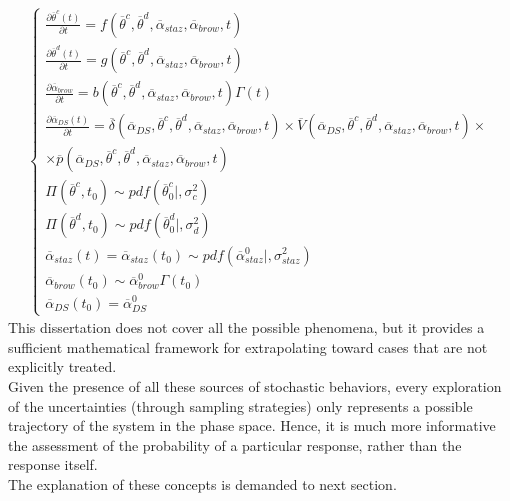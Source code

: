 \begin{equation}
\label{eq:fullSystemApprox1-3}
\begin{split}
\left\{\begin{matrix}
\frac{\partial  \overline{\theta}^{c}\left ( t \right )}{\partial t}=f\left ( \overline{\theta}^{c},\overline{\theta}^{d}, \overline{\alpha}_{staz} ,\overline{\alpha}_{brow},      t \right ) \\
\frac{\partial  \overline{\theta}^{d}\left ( t \right )}{\partial t}=g\left ( \overline{\theta}^{c},\overline{\theta}^{d},\overline{\alpha}_{staz},\overline{\alpha}_{brow},t \right )\\
\frac{\partial \overline{\alpha}_{brow} }{\partial t}=b\left ( \overline{\theta}^{c},\overline{\theta}^{d},\overline{\alpha}_{staz},\overline{\alpha}_{brow},t \right )\Gamma \left ( t \right ) \\
\frac{\partial  \overline{\alpha }_{DS}\left ( t \right )}{\partial t}=  \overline{\delta}\left ( \overline{\alpha }_{DS}, \overline{\theta}^{c},\overline{\theta}^{d},\overline{\alpha}_{staz},\overline{\alpha}_{brow},t \right ) \times \overline{V}\left ( \overline{\alpha }_{DS}, \overline{\theta}^{c},\overline{\theta}^{d},\overline{\alpha}_{staz},\overline{\alpha}_{brow},t \right ) \times
\\ \times  \overline{p}\left ( \overline{\alpha }_{DS}, \overline{\theta}^{c},\overline{\theta}^{d},\overline{\alpha}_{staz},\overline{\alpha}_{brow},t \right )
\\
\Pi \left ( \overline{\theta}^{c},t_{0} \right ) \sim pdf\left ( \overline{\theta}^{c}_{0}|,\sigma_{c}^{2} \right )\\
\Pi \left ( \overline{\theta}^{d},t_{0} \right ) \sim pdf\left ( \overline{\theta}^{d}_{0}|,\sigma_{d}^{2} \right ) \\
\overline{\alpha}_{staz}\left ( t \right )=\overline{\alpha}_{staz}\left ( t_{0} \right ) \sim pdf\left ( \overline{\alpha}_{staz}^{0}|, \sigma_{staz}^{2} \right ) \\
\overline{\alpha}_{brow}\left ( t_{0} \right ) \sim  \overline{\alpha}_{brow}^{0} \Gamma \left ( t_{0} \right ) \\
\overline{\alpha}_{DS} \left ( t_{0} \right ) = \overline{\alpha}_{DS} ^{0}
\end{matrix}\right.
\end{split}
\end{equation}
This dissertation does not cover all the possible phenomena, but it
provides a sufficient mathematical framework for extrapolating toward cases that are not explicitly treated.
\\ Given the presence of all these sources of stochastic behaviors, every
exploration of the uncertainties (through sampling strategies) only
represents a possible trajectory of the system in the phase space. Hence,
it is much more informative the assessment of the probability of a
particular response, rather than the response itself.
\\The explanation of these concepts is demanded to next section.
%
%
%
%
